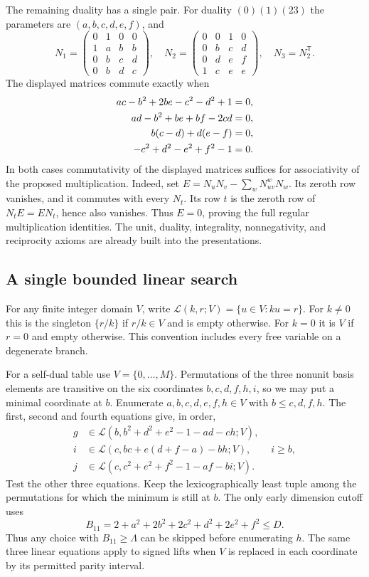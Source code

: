 \documentclass[11pt,a4paper]{article}
\theoremstyle{definition}\newtheorem{definition}[theorem]{Definition}
\theoremstyle{remark}\newtheorem{remark}[theorem]{Remark}
\numberwithin{equation}{section}
\begin{document}
The remaining duality has a single pair. For duality $(0)(1)(23)$ the parameters are $(a,b,c,d,e,f)$,
and
\[
 N_1=\begin{pmatrix}0&1&0&0\\1&a&b&b\\0&b&c&d\\0&b&d&c\end{pmatrix},\quad
 N_2=\begin{pmatrix}0&0&1&0\\0&b&c&d\\0&d&e&f\\1&c&e&e\end{pmatrix},\quad
 N_3=N_2^{\mathsf T}.
\]
The displayed matrices commute exactly when
\begin{align}
 ac-b^2+2be-c^2-d^2+1&=0,\notag\\
 ad-b^2+be+bf-2cd&=0,\label{census:eq:ns-assoc}\\
 b(c-d)+d(e-f)&=0,\notag\\
 -c^2+d^2-e^2+f^2-1&=0.\notag
\end{align}
In both cases commutativity of the displayed matrices suffices for
associativity of the proposed multiplication. Indeed, set
$E=N_uN_v-\sum_w N_{uv}^{w}N_w$. Its zeroth row vanishes, and it
commutes with every $N_t$. Its row $t$ is the zeroth row of
$N_tE=EN_t$, hence also vanishes. Thus $E=0$, proving the full
regular multiplication identities. The unit, duality, integrality,
nonnegativity, and reciprocity axioms are already built into the
presentations.

\subsection{A single bounded linear search}\label{sec:linear-search}
For any finite integer domain $V$, write
$\mathcal L(k,r;V)=\{u\in V:ku=r\}$. For $k\ne0$ this is the singleton
$\{r/k\}$ if $r/k\in V$ and is empty otherwise. For $k=0$ it is
$V$ if $r=0$ and empty otherwise. This convention includes every free
variable on a degenerate branch.

For a self-dual table use $V=\{0,\ldots,M\}$. Permutations of the
three nonunit basis elements are transitive on the six coordinates
$b,c,d,f,h,i$, so we may put a minimal coordinate at $b$.
Enumerate $a,b,c,d,e,f,h\in V$ with $b\le c,d,f,h$. The first,
second and fourth equations give, in order,
\[
\begin{aligned}
g&\in\mathcal L(b,b^2+d^2+e^2-1-ad-ch;V),\\
i&\in\mathcal L(c,bc+e(d+f-a)-bh;V), \qquad i\ge b,\\
j&\in\mathcal L(c,c^2+e^2+f^2-1-af-bi;V).
\end{aligned}
\]
Test the other three equations. Keep the lexicographically least tuple
among the permutations for which the minimum is still at $b$.
The only early dimension cutoff uses
\[
B_{11}=2+a^2+2b^2+2c^2+d^2+2e^2+f^2\le D .
\]
Thus any choice with $B_{11}\ge\Lambda$ can be skipped before enumerating
$h$. The same three linear equations apply to signed lifts when $V$ is
replaced in each coordinate by its permitted parity interval.
\end{document}
